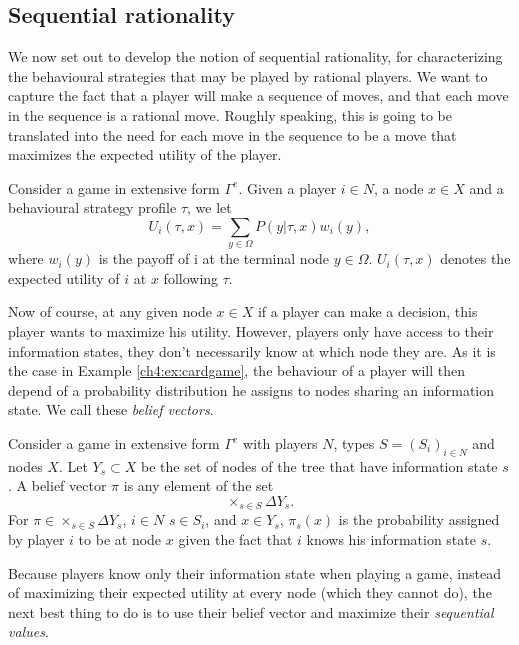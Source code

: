\subsection{Sequential rationality}

We now set out to develop the notion of sequential rationality, for characterizing the behavioural strategies that may be played by rational players. We want to capture the fact that a player will make a sequence of moves, and that each move in the sequence is a rational move. Roughly speaking, this is going to be translated into the need for each move in the sequence to be a move that maximizes the expected utility of the player.

\begin{definition}
Consider a game in extensive form $\Gamma^e$.
Given a player $i \in N$, a node $x \in X$ and a behavioural strategy profile $\tau$, we let 
$$U_i(\tau, x) = \sum_{y \in \Omega} P(y | \tau, x) w_i(y),$$
where $w_i(y)$ is the payoff of i at the terminal node $y \in \Omega$. $U_i(\tau, x)$ denotes the expected utility of $i$ at $x$ following $\tau$.  
\end{definition}

Now of course, at any given node $x \in X$ if a player can make a decision, this player wants to maximize his utility. However, players only have access to their information states, they don't necessarily know at which node they are. As it is the case in Example \ref{ch4:ex:cardgame}, the behaviour of a player will then depend of a probability distribution he assigns to nodes sharing an information state. We call these \emph{belief vectors}. 

\begin{definition}
Consider a game in extensive form $\Gamma^e$ with players $N$, types $S = (S_i)_{i \in N}$ and nodes $X$. Let $Y_s \subset X$ be the set of nodes of the tree that have information state $s$. 
A belief vector $\pi$ is any element of the set
$$ \times_{s \in S} \Delta Y_s.$$
For $\pi \in  \times_{s \in S} \Delta Y_s $, $i \in N$ $s \in S_i$, and $x \in Y_s$, $\pi_s(x)$ is the probability assigned by player $i$ to be at node $x$ given the fact that $i$ knows his information state $s$.
\end{definition}

Because players know only their information state when playing a game, instead of maximizing their expected utility at every node (which they cannot do), the next best thing to do is to use their belief vector and maximize their \emph{sequential values}.

